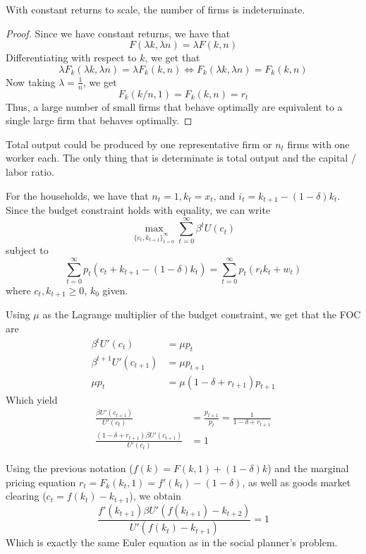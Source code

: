 \documentclass[10pt]{article}
\begin{document}
\begin{proposition}
	With constant returns to scale, the number of firms is indeterminate.
\end{proposition}
\begin{proof}
	Since we have constant returns, we have that
	\[
	F(\lambda k ,\lambda n) = \lambda F(k,n)
	\]
	Differentiating with respect to $k$, we get that
	\[
	\lambda F_k(\lambda k, \lambda n) = \lambda F_k(k,n) \Longleftrightarrow F_k(\lambda k,\lambda n) = F_k(k,n)
	\]
	Now taking $\lambda = \frac{1}{n}$, we get
	\[
	F_k(k / n, 1) = F_k(k,n) = r_t
	\]
	Thus, a large number of small firms that behave optimally are equivalent to a single large firm that behaves optimally.
\end{proof}

\begin{remark}
	Total output could be produced by one representative firm or $n_t$ firms with one worker each. The only thing that is determinate is total output and the capital / labor ratio.
\end{remark}

For the households, we have that $n_t = 1, k_t = x_t$, and $i_t = k_{t+1} - (1-\delta)k_t$. Since the budget constraint holds with equality, we can write
\[
\max_{\{c_t,k_{t+1}\}_{t=0}^\infty} \sum_{t=0}^\infty \beta^t U(c_t)
\]
subject to
\[
\sum_{t=0}^\infty p_t(c_t + k_{t+1} - (1-\delta)k_t) = \sum_{t=0}^\infty p_t(r_t k_t + w_t)
\]
where $c_t,k_{t+1} \ge 0$, $k_0$ given.

Using $\mu$ as the Lagrange multiplier of the budget constraint, we get that the FOC are
\begin{align*}
	\beta^t U'(c_t) &= \mu p_t \\
	\beta^{t+1} U'(c_{t+1}) &= \mu p_{t+1} \\
	\mu p_t &= \mu(1 - \delta + r_{t+1})p_{t+1}
\end{align*}
Which yield
\begin{align*}
	\frac{\beta U'(c_{t+1})}{U'(c_t)} &= \frac{p_{t+1}}{p_t} = \frac{1}{1 - \delta + r_{t+1}} \\
	\frac{(1 - \delta + r_{t+1})\beta U'(c_{t+1})}{U'(c_t)} &= 1
\end{align*}

Using the previous notation ($f(k) = F(k,1) + (1-\delta)k$) and the marginal pricing equation $r_t = F_k(k_t,1) = f'(k_t) - (1-\delta)$, as well as goods market clearing ($c_t = f(k_t) - k_{t+1}$), we obtain
\[
\frac{f'(k_{t+1}) \beta U'(f(k_{t+1}) - k_{t+2})}{U'(f(k_t) - k_{t+1})} = 1
\]
Which is exactly the same Euler equation as in the social planner's problem.
\end{document}
